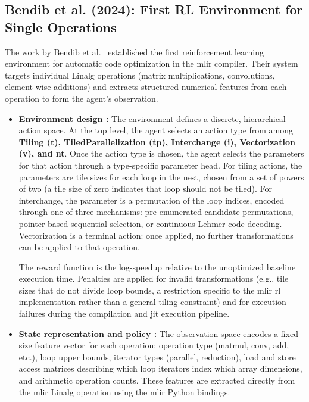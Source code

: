 \subsection{Bendib et al. (2024): First RL Environment for Single Operations}

The work by Bendib et al.~\cite{bendib2024reinforcement} established the first reinforcement learning environment for automatic code optimization in the \gls{mlir} compiler. Their system targets individual Linalg operations (matrix multiplications, convolutions, element-wise additions) and extracts structured numerical features from each operation to form the agent's observation.

\begin{itemize}
\item \textbf{Environment design :} The environment defines a discrete, hierarchical action space. At the top level, the agent selects an action type from among \textbf{Tiling (\gls{t}), TiledParallelization (\gls{tp}), Interchange (\gls{i}), Vectorization (\gls{v}), and \gls{nt}}. Once the action type is chosen, the agent selects the parameters for that action through a type-specific parameter head. For tiling actions, the parameters are tile sizes for each loop in the nest, chosen from a set of powers of two (a tile size of zero indicates that loop should not be tiled). For interchange, the parameter is a permutation of the loop indices, encoded through one of three mechanisms: pre-enumerated candidate permutations, pointer-based sequential selection, or continuous Lehmer-code decoding. Vectorization is a terminal action: once applied, no further transformations can be applied to that operation.

The reward function is the log-speedup relative to the unoptimized baseline execution time. Penalties are applied for invalid transformations (e.g., tile sizes that do not divide loop bounds, a restriction specific to the \gls{mlir} \gls{rl} implementation rather than a general tiling constraint) and for execution failures during the compilation and \gls{jit} execution pipeline.

\item \textbf{State representation and policy :} The observation space encodes a fixed-size feature vector for each operation: operation type (matmul, conv, add, etc.), loop upper bounds, iterator types (parallel, reduction), load and store access matrices describing which loop iterators index which array dimensions, and arithmetic operation counts. These features are extracted directly from the \gls{mlir} Linalg operation using the \gls{mlir} Python bindings.


\end{itemize}
